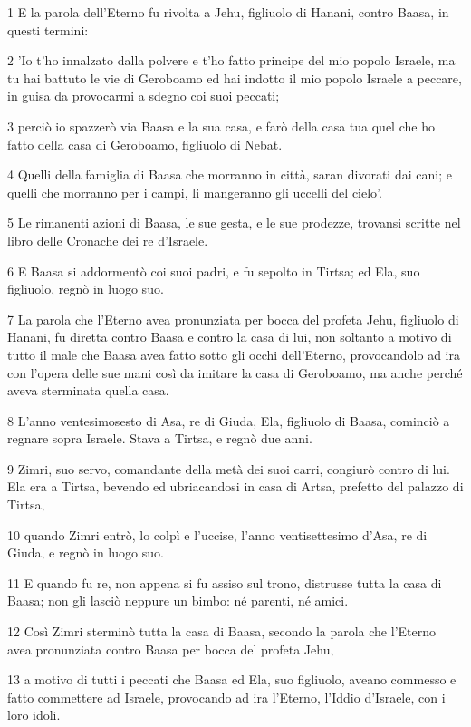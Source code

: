 \par 1 E la parola dell'Eterno fu rivolta a Jehu, figliuolo di Hanani, contro Baasa, in questi termini:
\par 2 'Io t'ho innalzato dalla polvere e t'ho fatto principe del mio popolo Israele, ma tu hai battuto le vie di Geroboamo ed hai indotto il mio popolo Israele a peccare, in guisa da provocarmi a sdegno coi suoi peccati;
\par 3 perciò io spazzerò via Baasa e la sua casa, e farò della casa tua quel che ho fatto della casa di Geroboamo, figliuolo di Nebat.
\par 4 Quelli della famiglia di Baasa che morranno in città, saran divorati dai cani; e quelli che morranno per i campi, li mangeranno gli uccelli del cielo'.
\par 5 Le rimanenti azioni di Baasa, le sue gesta, e le sue prodezze, trovansi scritte nel libro delle Cronache dei re d'Israele.
\par 6 E Baasa si addormentò coi suoi padri, e fu sepolto in Tirtsa; ed Ela, suo figliuolo, regnò in luogo suo.
\par 7 La parola che l'Eterno avea pronunziata per bocca del profeta Jehu, figliuolo di Hanani, fu diretta contro Baasa e contro la casa di lui, non soltanto a motivo di tutto il male che Baasa avea fatto sotto gli occhi dell'Eterno, provocandolo ad ira con l'opera delle sue mani così da imitare la casa di Geroboamo, ma anche perché aveva sterminata quella casa.
\par 8 L'anno ventesimosesto di Asa, re di Giuda, Ela, figliuolo di Baasa, cominciò a regnare sopra Israele. Stava a Tirtsa, e regnò due anni.
\par 9 Zimri, suo servo, comandante della metà dei suoi carri, congiurò contro di lui. Ela era a Tirtsa, bevendo ed ubriacandosi in casa di Artsa, prefetto del palazzo di Tirtsa,
\par 10 quando Zimri entrò, lo colpì e l'uccise, l'anno ventisettesimo d'Asa, re di Giuda, e regnò in luogo suo.
\par 11 E quando fu re, non appena si fu assiso sul trono, distrusse tutta la casa di Baasa; non gli lasciò neppure un bimbo: né parenti, né amici.
\par 12 Così Zimri sterminò tutta la casa di Baasa, secondo la parola che l'Eterno avea pronunziata contro Baasa per bocca del profeta Jehu,
\par 13 a motivo di tutti i peccati che Baasa ed Ela, suo figliuolo, aveano commesso e fatto commettere ad Israele, provocando ad ira l'Eterno, l'Iddio d'Israele, con i loro idoli.
